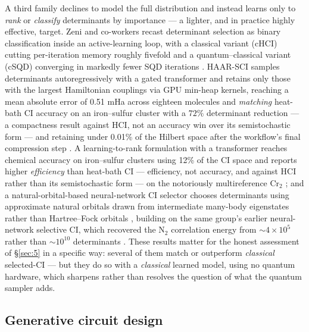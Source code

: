 \documentclass[onecolumn,a4paper]{quantumarticle}
\begin{document}
A third family declines to model the full distribution and instead learns only to \emph{rank} or \emph{classify} determinants by importance --- a lighter, and in practice highly effective, target. Zeni and co-workers recast determinant selection as binary classification inside an active-learning loop, with a classical variant (cHCI) cutting per-iteration memory roughly fivefold and a quantum--classical variant (cSQD) converging in markedly fewer SQD iterations \cite{zeni2026}. HAAR-SCI samples determinants autoregressively with a gated transformer and retains only those with the largest Hamiltonian couplings via GPU min-heap kernels, reaching a mean absolute error of 0.51 mHa across eighteen molecules and \emph{matching} heat-bath CI accuracy on an iron--sulfur cluster with a $72\%$ determinant reduction --- a compactness result against HCI, not an accuracy win over its semistochastic form --- and retaining under 0.01\% of the Hilbert space after the workflow's final compression step \cite{zhanghaar2025}. A learning-to-rank formulation with a transformer reaches chemical accuracy on iron--sulfur clusters using 12\% of the CI space and reports higher \emph{efficiency} than heat-bath CI --- efficiency, not accuracy, and against HCI rather than its semistochastic form --- on the notoriously multireference Cr$_2$ \cite{nie2026}; and a natural-orbital-based neural-network CI selector chooses determinants using approximate natural orbitals drawn from intermediate many-body eigenstates rather than Hartree--Fock orbitals \cite{thirion2025}, building on the same group's earlier neural-network selective CI, which recovered the N$_2$ correlation energy from ${\sim}4\times10^{5}$ rather than ${\sim}10^{10}$ determinants \cite{schmerwitz2024}. These results matter for the honest assessment of \S\ref{sec:5} in a specific way: several of them match or outperform \emph{classical} selected-CI --- but they do so with a \emph{classical} learned model, using no quantum hardware, which sharpens rather than resolves the question of what the quantum sampler adds.


\subsection{Generative circuit design}\label{sec:4-5}
\end{document}
